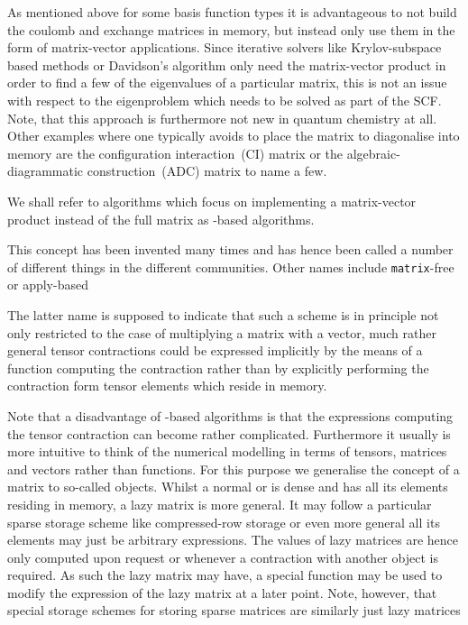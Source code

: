 As mentioned above for some basis function types it is advantageous
to not build the coulomb and exchange matrices in memory,
but instead only use them in the form of matrix-vector applications.
Since iterative solvers like Krylov-subspace based methods or Davidson's algorithm
only need the matrix-vector product in order to find a few of the eigenvalues
of a particular matrix,
this is not an issue with respect to the eigenproblem which needs to be solved
as part of the SCF.
Note, that this approach is furthermore not new in quantum chemistry at all.
Other examples where one typically avoids to place the matrix to diagonalise
into memory are the configuration interaction~(CI) matrix
or the algebraic-diagrammatic construction~(ADC) matrix to name a few.

We shall refer to algorithms which focus on implementing a matrix-vector product
instead of the full matrix as \contraction-based algorithms.

This concept has been invented many times
and has hence been called a number of different things
in the different communities.
Other names include \texttt{matrix}-free
or apply-based


The latter name is supposed to indicate that such a scheme is in principle
not only restricted to the case of multiplying a matrix with a vector,
much rather general tensor contractions could be expressed implicitly
by the means of a function computing the contraction rather than
by explicitly performing the contraction form tensor elements
which reside in memory.

Note that a disadvantage of \contraction-based algorithms is that the expressions
computing the tensor contraction can become rather complicated.
Furthermore it usually is more intuitive to think of the
numerical modelling in terms of tensors, matrices and vectors
rather than \contraction functions.
For this purpose we generalise the concept of a matrix
to so-called  objects.
Whilst a normal or  is dense and has all its elements
residing in memory,
a lazy matrix is more general.
It may follow a particular sparse storage scheme
like compressed-row storage
or even more general all its elements may just be arbitrary expressions.
The values of lazy matrices are hence only computed upon request
or whenever a contraction with another object is required.
As such the lazy matrix may have, \ie a special \update function
may be used to modify the expression of the lazy matrix
at a later point.
Note, however, that special storage schemes for storing
sparse matrices are similarly just lazy matrices 

